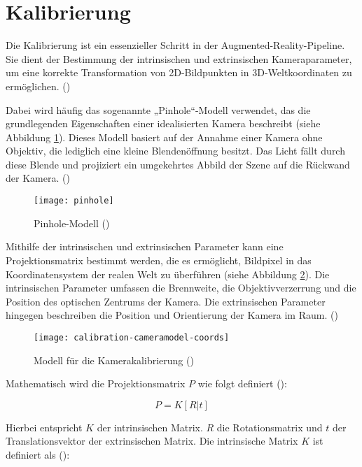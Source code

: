 \section{Kalibrierung}\label{Kalibrierung}

Die Kalibrierung ist ein essenzieller Schritt in der Augmented-Reality-Pipeline. Sie dient der Bestimmung der intrinsischen und extrinsischen Kameraparameter, um eine korrekte Transformation von 2D-Bildpunkten in 3D-Weltkoordinaten zu ermöglichen. (\cite{mw2024calibration})

Dabei wird häufig das sogenannte „Pinhole“-Modell verwendet, das die grundlegenden Eigenschaften einer idealisierten Kamera beschreibt (siehe Abbildung \ref{fig:Pinhole}). Dieses Modell basiert auf der Annahme einer Kamera ohne Objektiv, die lediglich eine kleine Blendenöffnung besitzt. Das Licht fällt durch diese Blende und projiziert ein umgekehrtes Abbild der Szene auf die Rückwand der Kamera. (\cite{mw2024calibration})

\begin{figure}
    \centering
    \texttt{[image: pinhole]}
    \caption{Pinhole-Modell (\cite{mw2024calibration})\label{fig:Pinhole}}\par
\end{figure}

Mithilfe der intrinsischen und extrinsischen Parameter kann eine Projektionsmatrix bestimmt werden, die es ermöglicht, Bildpixel in das Koordinatensystem der realen Welt zu überführen (siehe Abbildung \ref{fig:Kalibrierung}). Die intrinsischen Parameter umfassen die Brennweite, die Objektivverzerrung und die Position des optischen Zentrums der Kamera. Die extrinsischen Parameter hingegen beschreiben die Position und Orientierung der Kamera im Raum. (\cite{mw2024calibration})

\begin{figure}
    \centering
    \texttt{[image: calibration-cameramodel-coords]}
    \caption{Modell für die Kamerakalibrierung (\cite{mw2024calibration})\label{fig:Kalibrierung}}\par
\end{figure}

Mathematisch wird die Projektionsmatrix \(P\) wie folgt definiert (\cite{mw2024calibration, szeliski2022computerVision}):

\[
P = K[R|t]
\]

Hierbei entspricht \(K\) der intrinsischen Matrix. \(R\) die Rotationsmatrix und \(t\) der Translationsvektor der extrinsischen Matrix. Die intrinsische Matrix \(K\) ist definiert als (\cite{mw2024calibration}):


